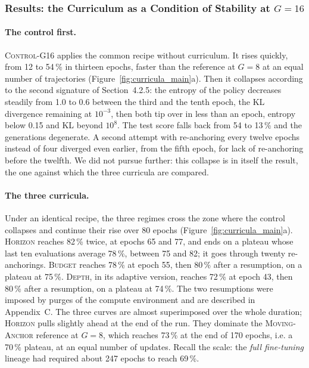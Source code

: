 \documentclass[11pt,a4paper]{article}
\begin{document}
\subsubsection{Results: the Curriculum as a Condition of Stability at $G=16$}

\paragraph{The control first.} \textsc{Control-G16} applies the common recipe without curriculum. It rises quickly, from 12 to 54\,\% in thirteen epochs, faster than the reference at $G=8$ at an equal number of trajectories (Figure~\ref{fig:curricula_main}a). Then it collapses according to the second signature of Section~4.2.5: the entropy of the policy decreases steadily from 1.0 to 0.6 between the third and the tenth epoch, the KL divergence remaining at $10^{-3}$, then both tip over in less than an epoch, entropy below 0.15 and KL beyond $10^{8}$. The test score falls back from 54 to 13\,\% and the generations degenerate. A second attempt with re-anchoring every twelve epochs instead of four diverged even earlier, from the fifth epoch, for lack of re-anchoring before the twelfth. We did not pursue further: this collapse is in itself the result, the one against which the three curricula are compared.

\paragraph{The three curricula.} Under an identical recipe, the three regimes cross the zone where the control collapses and continue their rise over 80 epochs (Figure~\ref{fig:curricula_main}a). \textsc{Horizon} reaches 82\,\% twice, at epochs 65 and 77, and ends on a plateau whose last ten evaluations average 78\,\%, between 75 and 82; it goes through twenty re-anchorings. \textsc{Budget} reaches 78\,\% at epoch 55, then 80\,\% after a resumption, on a plateau at 75\,\%. \textsc{Depth}, in its adaptive version, reaches 72\,\% at epoch 43, then 80\,\% after a resumption, on a plateau at 74\,\%. The two resumptions were imposed by purges of the compute environment and are described in Appendix~C. The three curves are almost superimposed over the whole duration; \textsc{Horizon} pulls slightly ahead at the end of the run. They dominate the \textsc{Moving-Anchor} reference at $G=8$, which reaches 73\,\% at the end of 170 epochs, i.e. a 70\,\% plateau, at an equal number of updates. Recall the scale: the \emph{full fine-tuning} lineage had required about 247 epochs to reach 69\,\%.
\end{document}
